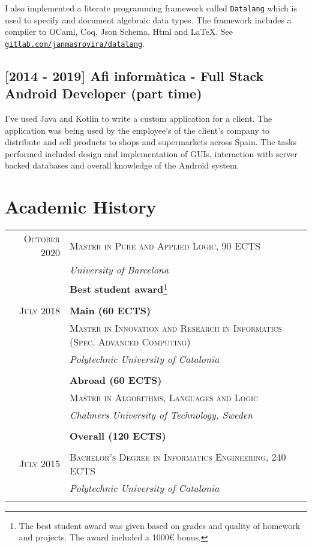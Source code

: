 \documentclass[11pt]{article}
\begin{document}
I also implemented a literate programming framework called \texttt{Datalang}
which is used to specify and document algebraic data types. The framework
includes a compiler to OCaml, Coq, Json Schema, Html and LaTeX. See
\href{https://gitlab.com/janmasrovira/datalang}{\texttt{gitlab.com/janmasrovira/datalang}}.

\subsection*{[2014 - 2019] Afi informàtica - Full Stack Android Developer (part time)}
I've used Java and Kotlin to write a custom application for a client. The
application was being used by the employee's of the client's company to
distribute and sell products to shops and supermarkets across Spain. The tasks
performed included design and implementation of GUIs, interaction with server
backed databases and overall knowledge of the Android system.

\section{Academic History}

\begin{tabular}{r|p{11cm}}
  \textsc{October 2020} & \textsc{Master in Pure and Applied Logic, 90 ECTS} \\
 & \emph{University of Barcelona}\\
                        & \textbf{Best student award}\footnote{The best student award was given based on grades and quality
                            of homework and projects. The award included a 1000€ bonus.} \\
\multicolumn{2}{c}{} \\

  \textsc{July 2018} & \textbf{Main (60 ECTS)} \\
                        & \textsc{Master in Innovation and Research in Informatics (Spec. Advanced Computing)} \\
                        & \emph{Polytechnic University of Catalonia} \\
                         \\
 & \textbf{Abroad (60 ECTS)}  \\
  & \textsc{Master in Algorithms, Languages and Logic} \\
                        & \emph{Chalmers University of Technology, Sweden} \\
                        \\
                        & \textbf{Overall (120 ECTS)}  \\
  \multicolumn{2}{c}{} \\

  \textsc{July 2015} & \textsc{Bachelor's Degree in Informatics Engineering, 240 ECTS} \\
               & \emph{Polytechnic University of Catalonia}\\
  \multicolumn{2}{c}{} \\
\end{tabular}
\end{document}
